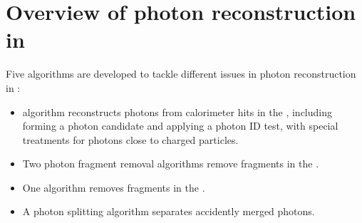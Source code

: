 \section{Overview of photon reconstruction in \pandora}



Five algorithms are developed to tackle different issues in photon reconstruction in \pandora:
\begin{itemize}
  \item \PhotonReconstruction algorithm reconstructs photons from calorimeter hits in the \ECAL, including forming a photon candidate and applying a photon ID test, with special treatments for photons close to charged particles.
  \item Two photon fragment removal algorithms remove fragments in the \ECAL.
  \item  One algorithm removes fragments in the \HCAL.
  \item A photon splitting algorithm separates accidently merged photons.
\end{itemize}

